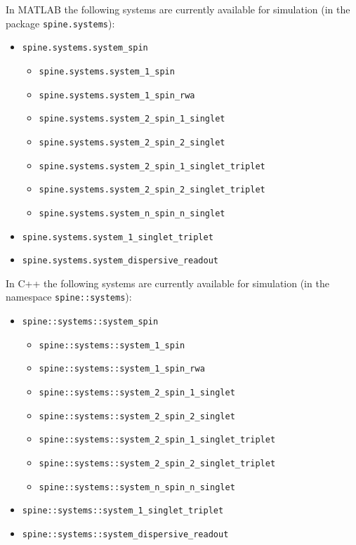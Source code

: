 \documentclass[10pt,a4paper,onecolumn,notitlepage]{article}
\begin{document}
In MATLAB the following systems are currently available for simulation (in the package \lstinline{spine.systems}):
\begin{itemize}
	\item \lstinline{spine.systems.system_spin}
		\begin{itemize}
			\item \lstinline{spine.systems.system_1_spin}
			\item \lstinline{spine.systems.system_1_spin_rwa}
			\item \lstinline{spine.systems.system_2_spin_1_singlet}
			\item \lstinline{spine.systems.system_2_spin_2_singlet}
			\item \lstinline{spine.systems.system_2_spin_1_singlet_triplet}
			\item \lstinline{spine.systems.system_2_spin_2_singlet_triplet}
			\item \lstinline{spine.systems.system_n_spin_n_singlet}
		\end{itemize}
	\item \lstinline{spine.systems.system_1_singlet_triplet}
	\item \lstinline{spine.systems.system_dispersive_readout}

\end{itemize}
In C++ the following systems are currently available for simulation (in the namespace \lstinline{spine::systems}):
\begin{itemize}
	\item \lstinline{spine::systems::system_spin}
		\begin{itemize}
			\item \lstinline{spine::systems::system_1_spin}
			\item \lstinline{spine::systems::system_1_spin_rwa}
			\item \lstinline{spine::systems::system_2_spin_1_singlet}
			\item \lstinline{spine::systems::system_2_spin_2_singlet}
			\item \lstinline{spine::systems::system_2_spin_1_singlet_triplet}
			\item \lstinline{spine::systems::system_2_spin_2_singlet_triplet}
			\item \lstinline{spine::systems::system_n_spin_n_singlet}
		\end{itemize}
	\item \lstinline{spine::systems::system_1_singlet_triplet}
	\item \lstinline{spine::systems::system_dispersive_readout}
\end{itemize}
\end{document}
